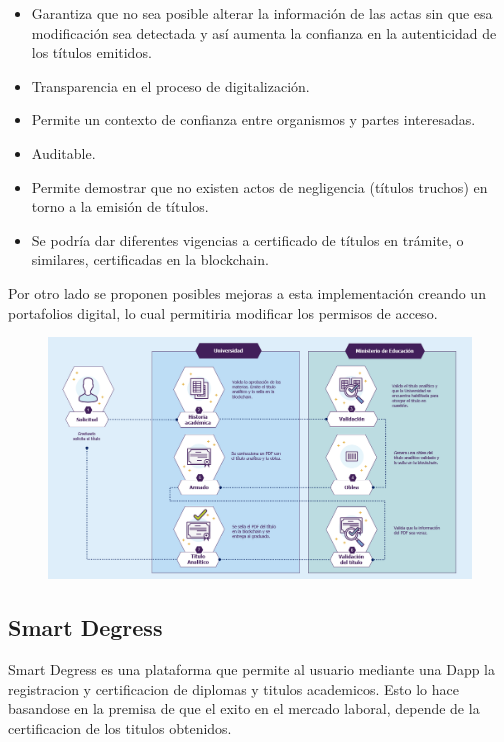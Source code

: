 \documentclass[11pt,a4paper]{article}
\begin{document}
        \begin{itemize}
            \item Garantiza que no sea posible alterar la 
            información de las actas sin que esa modificación sea detectada y así aumenta la confianza en la autenticidad de los títulos emitidos. 
            \item Transparencia en el proceso de digitalización.
            \item Permite un contexto de confianza entre organismos y partes interesadas. 
            \item Auditable.
            \item Permite demostrar que no existen actos de negligencia (títulos truchos) en torno a la emisión de títulos.
            \item Se podría dar diferentes vigencias a certificado de títulos en trámite, o similares, certificadas en la blockchain.
        \end{itemize}

        Por otro lado se proponen posibles mejoras a esta implementación creando un portafolios digital, lo cual 
        permitiria modificar los permisos de acceso.

        \begin{figure}
            \centering
            \includegraphics[width=\textwidth]{Img/cuadro_problematica.png}
            \caption{}
            \label{fig:cuadro_problematica}
        \end{figure}

        \subsection{Smart Degress}
        
        Smart Degress es una plataforma que permite al usuario mediante una Dapp la registracion y
        certificacion de diplomas y titulos academicos. Esto lo hace basandose en la premisa de que el 
        exito en el mercado laboral, depende de la certificacion de los titulos obtenidos.
\end{document}
